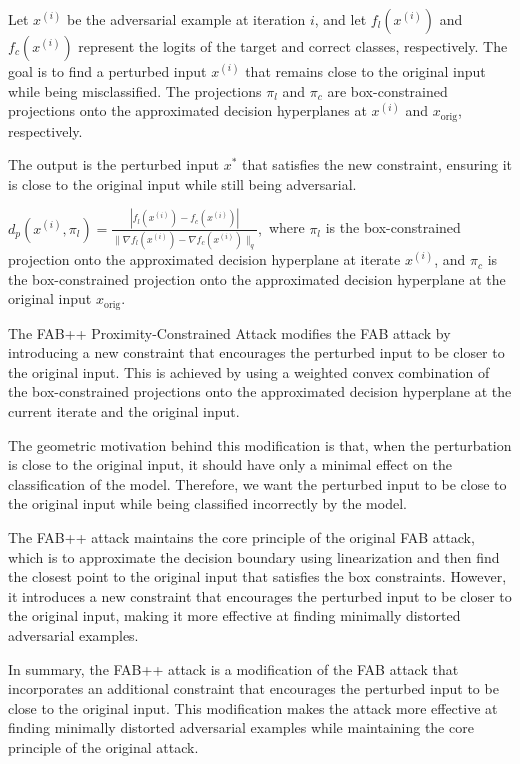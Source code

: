 Let $x^{(i)}$ be the adversarial example at iteration $i$, and let $f_l(x^{(i)})$ and $f_c(x^{(i)})$ represent the logits of the target and correct classes, respectively. The goal is to find a perturbed input $x^{(i)}$ that remains close to the original input while being misclassified. The projections $\pi_l$ and $\pi_c$ are box-constrained projections onto the approximated decision hyperplanes at $x^{(i)}$ and $x_{\text{orig}}$, respectively.

The output is the perturbed input $x^*$ that satisfies the new constraint, ensuring it is close to the original input while still being adversarial.


$d_p(x^{(i)}, \pi_l) = \frac{|f_l(x^{(i)}) - f_c(x^{(i)})|}{\|\nabla f_l(x^{(i)}) - \nabla f_c(x^{(i)})\|_q},$
where $\pi_l$ is the box-constrained projection onto the approximated decision hyperplane at iterate $x^{(i)}$, and $\pi_c$ is the box-constrained projection onto the approximated decision hyperplane at the original input $x_{\text{orig}}$.


The FAB++ Proximity-Constrained Attack modifies the FAB attack by introducing a new constraint that encourages the perturbed input to be closer to the original input. This is achieved by using a weighted convex combination of the box-constrained projections onto the approximated decision hyperplane at the current iterate and the original input.

The geometric motivation behind this modification is that, when the perturbation is close to the original input, it should have only a minimal effect on the classification of the model. Therefore, we want the perturbed input to be close to the original input while being classified incorrectly by the model.

The FAB++ attack maintains the core principle of the original FAB attack, which is to approximate the decision boundary using linearization and then find the closest point to the original input that satisfies the box constraints. However, it introduces a new constraint that encourages the perturbed input to be closer to the original input, making it more effective at finding minimally distorted adversarial examples.

In summary, the FAB++ attack is a modification of the FAB attack that incorporates an additional constraint that encourages the perturbed input to be close to the original input. This modification makes the attack more effective at finding minimally distorted adversarial examples while maintaining the core principle of the original attack.